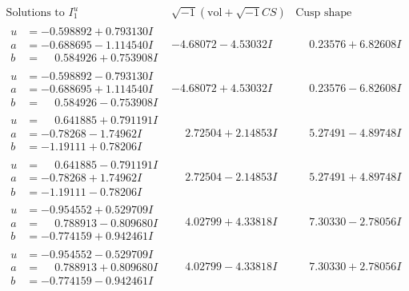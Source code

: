 \documentclass[1p]{elsarticle_modified}
\theoremstyle{definition}
\newcommand{\I}{\sqrt{-1}}
\begin{document}
$$\begin{array}{c|c|c}  
\text{Solutions to }I^u_{1}& \I (\text{vol} + \sqrt{-1}CS) & \text{Cusp shape}\\
 \hline 
\begin{aligned}
u &= -0.598892 + 0.793130 I \\
a &= -0.688695 - 1.114540 I \\
b &= \phantom{-}0.584926 + 0.753908 I\end{aligned}
 & -4.68072 - 4.53032 I & \phantom{-}0.23576 + 6.82608 I \\ \hline\begin{aligned}
u &= -0.598892 - 0.793130 I \\
a &= -0.688695 + 1.114540 I \\
b &= \phantom{-}0.584926 - 0.753908 I\end{aligned}
 & -4.68072 + 4.53032 I & \phantom{-}0.23576 - 6.82608 I \\ \hline\begin{aligned}
u &= \phantom{-}0.641885 + 0.791191 I \\
a &= -0.78268 - 1.74962 I \\
b &= -1.19111 + 0.78206 I\end{aligned}
 & \phantom{-}2.72504 + 2.14853 I & \phantom{-}5.27491 - 4.89748 I \\ \hline\begin{aligned}
u &= \phantom{-}0.641885 - 0.791191 I \\
a &= -0.78268 + 1.74962 I \\
b &= -1.19111 - 0.78206 I\end{aligned}
 & \phantom{-}2.72504 - 2.14853 I & \phantom{-}5.27491 + 4.89748 I \\ \hline\begin{aligned}
u &= -0.954552 + 0.529709 I \\
a &= \phantom{-}0.788913 - 0.809680 I \\
b &= -0.774159 + 0.942461 I\end{aligned}
 & \phantom{-}4.02799 + 4.33818 I & \phantom{-}7.30330 - 2.78056 I \\ \hline\begin{aligned}
u &= -0.954552 - 0.529709 I \\
a &= \phantom{-}0.788913 + 0.809680 I \\
b &= -0.774159 - 0.942461 I\end{aligned}
 & \phantom{-}4.02799 - 4.33818 I & \phantom{-}7.30330 + 2.78056 I \\ \hline\begin{aligned}

\end{aligned}
\end{array}$$
\end{document}
